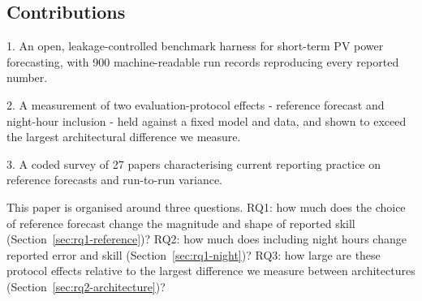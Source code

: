 \subsection{Contributions}
\label{sec:intro-contributions}

1. An open, leakage-controlled benchmark harness for short-term PV
power forecasting, with 900 machine-readable run records reproducing
every reported number.

2. A measurement of two evaluation-protocol effects - reference
forecast and night-hour inclusion - held against a fixed model and
data, and shown to exceed the largest architectural difference we
measure.

3. A coded survey of 27 papers characterising current reporting
practice on reference forecasts and run-to-run variance.

This paper is organised around three questions. RQ1: how much does the
choice of reference forecast change the magnitude and shape of
reported skill (Section~\ref{sec:rq1-reference})? RQ2: how much does
including night hours change reported error and skill
(Section~\ref{sec:rq1-night})? RQ3: how large are these protocol
effects relative to the largest difference we measure between
architectures (Section~\ref{sec:rq2-architecture})?
